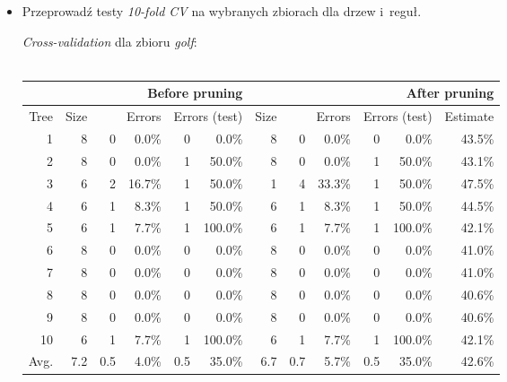 \documentclass{article}
\begin{document}
\begin{itemize}
\item Przeprowadź testy \emph{10-fold CV} na wybranych zbiorach dla drzew i~reguł.


\emph{Cross-validation} dla zbioru \emph{golf}:\\\\
\begin{tabular}{|r||r|rr|rr||r|rr|rr|r|}
\hline
&\multicolumn{5}{1||}{Before pruning}&\multicolumn{6}{1|}{After pruning} \\
\hline
Tree & 
Size & 
\multicolumn{2}{1|}{Errors} & 
\multicolumn{2}{1||}{Errors (test)} & 
Size & 
\multicolumn{2}{1|}{Errors} & 
\multicolumn{2}{1|}{Errors (test)} & 
Estimate \\
\hline\hline
    1 &    8 &    0 &  0.0\% &    0 &   0.0\% &    8 &    0 &  0.0\% &    0 &   0.0\% &  43.5\%  \\
    2 &    8 &    0 &  0.0\% &    1 &  50.0\% &    8 &    0 &  0.0\% &    1 &  50.0\% &  43.1\%  \\
    3 &    6 &    2 & 16.7\% &    1 &  50.0\% &    1 &    4 & 33.3\% &    1 &  50.0\% &  47.5\%  \\
    4 &    6 &    1 &  8.3\% &    1 &  50.0\% &    6 &    1 &  8.3\% &    1 &  50.0\% &  44.5\%  \\
    5 &    6 &    1 &  7.7\% &    1 & 100.0\% &    6 &    1 &  7.7\% &    1 & 100.0\% &  42.1\%  \\
    6 &    8 &    0 &  0.0\% &    0 &   0.0\% &    8 &    0 &  0.0\% &    0 &   0.0\% &  41.0\%  \\
    7 &    8 &    0 &  0.0\% &    0 &   0.0\% &    8 &    0 &  0.0\% &    0 &   0.0\% &  41.0\%  \\
    8 &    8 &    0 &  0.0\% &    0 &   0.0\% &    8 &    0 &  0.0\% &    0 &   0.0\% &  40.6\%  \\
    9 &    8 &    0 &  0.0\% &    0 &   0.0\% &    8 &    0 &  0.0\% &    0 &   0.0\% &  40.6\%  \\
   10 &    6 &    1 &  7.7\% &    1 & 100.0\% &    6 &    1 &  7.7\% &    1 & 100.0\% &  42.1\%  \\
\hline\hline
 Avg. &  7.2 &  0.5 &  4.0\% &  0.5 &  35.0\% &  6.7 &  0.7 &  5.7\% &  0.5 &  35.0\% &  42.6\%  \\
\hline
\end{tabular}


\end{itemize}
\end{document}
